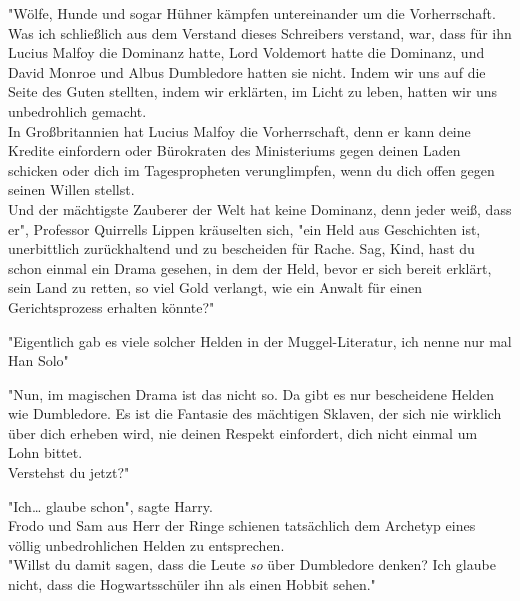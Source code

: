 {"Wölfe, Hunde und sogar Hühner kämpfen untereinander um die Vorherrschaft. Was ich schließlich aus dem Verstand dieses Schreibers verstand, war, dass für ihn Lucius Malfoy die Dominanz hatte, Lord Voldemort hatte die Dominanz, und David Monroe und Albus Dumbledore hatten sie nicht. Indem wir uns auf die Seite des Guten stellten, indem wir erklärten, im Licht zu leben, hatten wir uns unbedrohlich gemacht.\\ In Großbritannien hat Lucius Malfoy die Vorherrschaft, denn er kann deine Kredite einfordern oder Bürokraten des Ministeriums gegen deinen Laden schicken oder dich im Tagespropheten verunglimpfen, wenn du dich offen gegen seinen Willen stellst.\\ Und der mächtigste Zauberer der Welt hat keine Dominanz, denn jeder weiß, dass er", Professor Quirrells Lippen kräuselten sich, "ein Held aus Geschichten ist, unerbittlich zurückhaltend und zu bescheiden für Rache. Sag, Kind, hast du schon einmal ein Drama gesehen, in dem der Held, bevor er sich bereit erklärt, sein Land zu retten, so viel Gold verlangt, wie ein Anwalt für einen Gerichtsprozess erhalten könnte?"

"Eigentlich gab es viele solcher Helden in der Muggel-Literatur, ich nenne nur mal Han Solo"

"Nun, im magischen Drama ist das nicht so. Da gibt es nur bescheidene Helden wie Dumbledore. Es ist die Fantasie des mächtigen Sklaven, der sich nie wirklich über dich erheben wird, nie deinen Respekt einfordert, dich nicht einmal um Lohn bittet.\\ Verstehst du jetzt?"

"Ich… glaube schon", sagte Harry.\\ Frodo und Sam aus Herr der Ringe schienen tatsächlich dem Archetyp eines völlig unbedrohlichen Helden zu entsprechen.\\ "Willst du damit sagen, dass die Leute \emph{so} über Dumbledore denken? Ich glaube nicht, dass die Hogwartsschüler ihn als einen Hobbit sehen."

}
